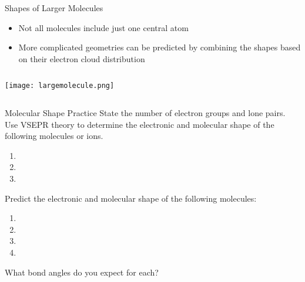 \documentclass[notes=hide]{beamer}
\begin{document}
\begin{frame}{Shapes of Larger Molecules}

	\begin{itemize}
		\item Not all molecules include just one central atom
		\item More complicated geometries can be predicted by combining 
			the shapes based on their electron cloud distribution
	\end{itemize}

	\bigskip

	\begin{columns}
		\centering
		\texttt{[image: largemolecule.png]}
		\centering
	\end{columns}
\end{frame}

\begin{frame}[t]{Molecular Shape Practice}
	State the number of electron groups and lone pairs. Use VSEPR theory to
	determine the electronic and molecular shape of the following molecules
	or ions.

	\begin{enumerate}
		\item {} 
		\item {} 
		\item {} 
	\end{enumerate}

	\vspace{10em}
\end{frame}

\begin{onyourown}{10em}
	Predict the electronic and molecular shape of the following molecules:

	\begin{enumerate}
		\item {}
		\item {}
		\item {}
		\item {}
	\end{enumerate}

	What bond angles do you expect for each?
\end{onyourown}
\end{document}
